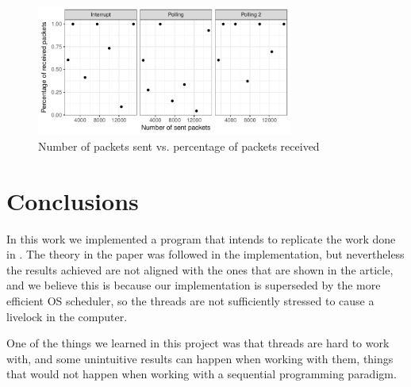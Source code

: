 \documentclass{article}
\begin{document}
\begin{figure}[H]
    \centering
    \includegraphics[width=0.75\textwidth]{number_packets_vs_percentage_received.pdf}
    \caption{Number of packets sent vs. percentage of packets received}
    \label{fig:percentage_received}
\end{figure}



\section{Conclusions}

In this work we implemented a program that intends to replicate the work done in  \cite{mogul1997eliminating}. The theory in the paper was followed in the implementation, but nevertheless the results achieved are not aligned with the ones that are shown in the article, and we believe this is because our implementation is superseded by the more efficient OS scheduler, so the threads are not sufficiently stressed to cause a livelock in the computer. 

One of the things we learned in this project was that threads are hard to work with, and some unintuitive results can happen when working with them, things that would not happen when working with a sequential programming paradigm.

\printbibliography
\end{document}
